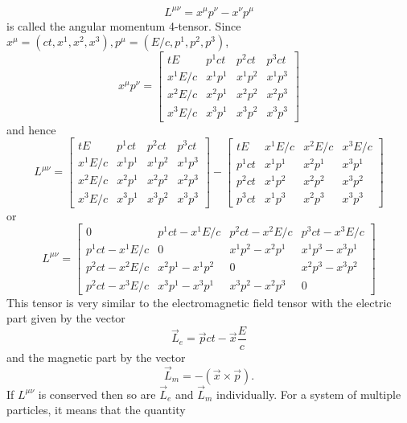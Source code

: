 \begin{enumerate}
\begin{equation}
L^{\mu\nu} = x^{\mu}p^{\nu} - x^{\nu}p^{\mu}
\end{equation}
is called the angular momentum 4-tensor. Since $x^\mu = (ct, x^1, x^2, x^3), 
p^\mu = (E/c, p^1, p^2, p^3)$,
\[
x^\mu p^\nu = \begin{bmatrix}tE & p^1ct & p^2ct & p^3ct \\
x^1E/c & x^1p^1 & x^1p^2 & x^1p^3 \\
x^2E/c & x^2p^1 & x^2p^2 & x^2p^3 \\
x^3E/c & x^3p^1 & x^3p^2 & x^3p^3
\end{bmatrix}
\]
and hence
\[
L^{\mu\nu} = \begin{bmatrix}tE & p^1ct & p^2ct & p^3ct \\
x^1E/c & x^1p^1 & x^1p^2 & x^1p^3 \\
x^2E/c & x^2p^1 & x^2p^2 & x^2p^3 \\
x^3E/c & x^3p^1 & x^3p^2 & x^3p^3
\end{bmatrix} - \begin{bmatrix}tE & x^1E/c & x^2E/c & x^3E/c \\
p^1ct & x^1p^1 & x^2p^1 & x^3p^1 \\
p^2ct & x^1p^2 & x^2p^2 & x^3p^2 \\
p^3ct & x^1p^3 & x^2p^3 & x^3p^3
\end{bmatrix}
\]
or
\begin{equation}\label{c2e87}
L^{\mu\nu} = \begin{bmatrix}0 & p^1ct - x^1E/c & p^2ct - x^2E/c & p^3ct - x^3E/c\\
p^1ct - x^1E/c & 0 & x^1p^2 - x^2p^1 & x^1p^3 - x^3p^1 \\
p^2ct - x^2E/c & x^2p^1 - x^1p^2 & 0 & x^2p^3 - x^3p^2 \\
p^2ct - x^3E/c & x^3p^1 - x^3p^1 & x^3p^2 - x^2p^3 & 0
\end{bmatrix}
\end{equation}
This tensor is very similar to the electromagnetic field tensor with the electric
part given by the vector
\begin{equation}\label{c2e88}
\vec{L}_e = \vec{p}ct - \vec{x}\frac{E}{c}
\end{equation}
and the magnetic part by the vector
\begin{equation}\label{c2e89}
\vec{L}_m = -(\vec{x} \times \vec{p}).
\end{equation}
If $L^{\mu\nu}$ is conserved then so are $\vec{L}_e$ and $\vec{L}_m$ individually.
For a system of multiple particles, it means that the quantity
\begin{equation}\label{c2e90}

\end{equation}
\end{enumerate}
